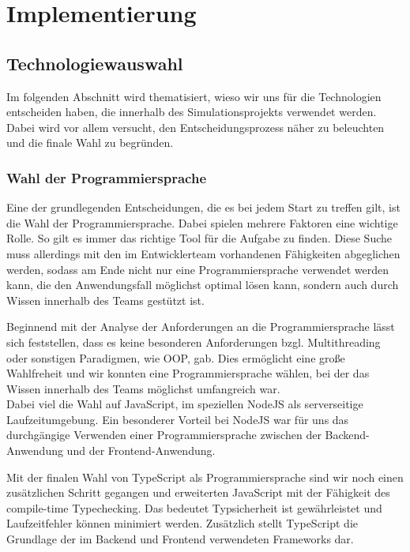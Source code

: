 \chapter{Implementierung}


\section{Technologiewauswahl}

Im folgenden Abschnitt wird thematisiert, wieso wir uns für die Technologien entscheiden haben, die innerhalb des Simulationsprojekts verwendet werden. Dabei wird vor allem versucht, den Entscheidungsprozess näher zu beleuchten und die finale Wahl zu begründen.

\subsection*{Wahl der Programmiersprache}
Eine der grundlegenden Entscheidungen, die es bei jedem Start zu treffen gilt, ist die Wahl der Programmiersprache. Dabei spielen mehrere Faktoren eine wichtige Rolle. So gilt es immer das richtige Tool für die Aufgabe zu finden. Diese Suche muss allerdings mit den im Entwicklerteam vorhandenen Fähigkeiten abgeglichen werden, sodass am Ende nicht nur eine Programmiersprache verwendet werden kann, die den Anwendungsfall möglichst optimal lösen kann, sondern auch durch Wissen innerhalb des Teams gestützt ist.

Beginnend mit der Analyse der Anforderungen an die Programmiersprache lässt sich feststellen, dass es keine besonderen Anforderungen bzgl. Multithreading oder sonstigen Paradigmen, wie OOP, gab. Dies ermöglicht eine große Wahlfreheit und wir konnten eine Programmiersprache wählen, bei der das Wissen innerhalb des Teams möglichst umfangreich war.\\
Dabei viel die Wahl auf JavaScript, im speziellen NodeJS als serverseitige Laufzeitumgebung. Ein besonderer Vorteil bei NodeJS war für uns das durchgängige Verwenden einer Programmiersprache zwischen der Backend-Anwendung und der Frontend-Anwendung.

Mit der finalen Wahl von TypeScript als Programmiersprache sind wir noch einen zusätzlichen Schritt gegangen und erweiterten JavaScript mit der Fähigkeit des compile-time Typechecking. Das bedeutet Typsicherheit ist gewährleistet und Laufzeitfehler können minimiert werden. Zusätzlich stellt TypeScript die Grundlage der im Backend und Frontend verwendeten Frameworks dar.

